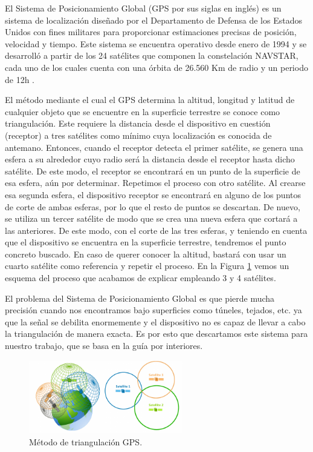 El Sistema de Posicionamiento Global (GPS por sus siglas en inglés) es un sistema de localización diseñado por el Departamento de
Defensa de los Estados Unidos con fines militares para proporcionar estimaciones precisas de posición,
velocidad y tiempo. Este sistema se encuentra operativo desde enero de 1994 y se desarrolló a partir de los 24 satélites que componen la constelación NAVSTAR, cada uno de los cuales cuenta con una órbita de 26.560 Km de radio y un periodo de 12h \citep{pozo2000sistema}. 

El método mediante el cual el GPS determina la altitud, longitud y latitud de cualquier objeto que se encuentre en la superficie terrestre se conoce como triangulación. Este requiere la distancia desde el dispositivo en cuestión (receptor) a tres satélites como mínimo cuya localización es conocida de antemano. Entonces, cuando el receptor detecta el primer satélite, se genera una esfera a su alrededor cuyo radio será la distancia desde el receptor hasta dicho satélite. De este modo, el receptor se encontrará en un punto de la superficie de esa esfera, aún por determinar. Repetimos el proceso con otro satélite. Al crearse esa segunda esfera, el dispositivo receptor se encontrará en alguno de los puntos de corte de ambas esferas, por lo que el resto de puntos se descartan. De nuevo, se utiliza un tercer satélite de modo que se crea una nueva esfera que cortará a las
anteriores. De este modo, con el corte de las tres esferas, y teniendo en cuenta que el dispositivo se encuentra en la superficie terrestre, tendremos el punto concreto buscado. En caso de querer conocer la altitud, bastará con usar un cuarto satélite como referencia y repetir el proceso. En la Figura \ref{fig:ejemplogps} vemos un esquema del proceso que acabamos de explicar empleando 3 y 4 satélites.

El problema del Sistema de Posicionamiento Global es que pierde mucha precisión cuando nos encontramos bajo superficies como túneles, tejados, etc. ya que la señal se debilita enormemente y el dispositivo no es capaz de llevar a cabo la triangulación de manera exacta. Es por esto que descartamos este sistema para nuestro trabajo, que se basa en la guía por interiores.

\begin{figure}[t]
	\centering
	\includegraphics[width=0.6\textwidth]{Imagenes/Estadodelacuestion/triangulacion}
	\caption{Método de triangulación GPS. }
	\label{fig:ejemplogps}
\end{figure}


